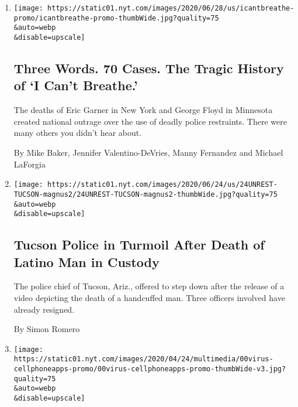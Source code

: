 \begin{enumerate}
\def\labelenumi{\arabic{enumi}.}
\item
  \href{/interactive/2020/06/28/us/i-cant-breathe-police-arrest.html}{}

  \texttt{[image: https://static01.nyt.com/images/2020/06/28/us/icantbreathe-promo/icantbreathe-promo-thumbWide.jpg?quality=75\\\&auto=webp\\\&disable=upscale]}

  \hypertarget{three-words-70-cases-the-tragic-history-of-i-cant-breathe}{%
  \subsection{Three Words. 70 Cases. The Tragic History of `I Can't
  Breathe.'}\label{three-words-70-cases-the-tragic-history-of-i-cant-breathe}}

  The deaths of Eric Garner in New York and George Floyd in Minnesota
  created national outrage over the use of deadly police restraints.
  There were many others you didn't hear about.

  By Mike Baker, Jennifer Valentino-DeVries, Manny Fernandez and Michael
  LaForgia
\item
  \href{/2020/06/24/us/tucson-police-carlos-ingram-lopez-death.html}{}

  \texttt{[image: https://static01.nyt.com/images/2020/06/24/us/24UNREST-TUCSON-magnus2/24UNREST-TUCSON-magnus2-thumbWide.jpg?quality=75\\\&auto=webp\\\&disable=upscale]}

  \hypertarget{tucson-police-in-turmoil-after-death-of-latino-man-in-custody}{%
  \subsection{Tucson Police in Turmoil After Death of Latino Man in
  Custody}\label{tucson-police-in-turmoil-after-death-of-latino-man-in-custody}}

  The police chief of Tucson, Ariz., offered to step down after the
  release of a video depicting the death of a handcuffed man. Three
  officers involved have already resigned.

  By Simon Romero
\item
  \href{/2020/04/29/business/coronavirus-cellphone-apps-contact-tracing.html}{}

  \texttt{[image: https://static01.nyt.com/images/2020/04/24/multimedia/00virus-cellphoneapps-promo/00virus-cellphoneapps-promo-thumbWide-v3.jpg?quality=75\\\&auto=webp\\\&disable=upscale]}


\end{enumerate}
